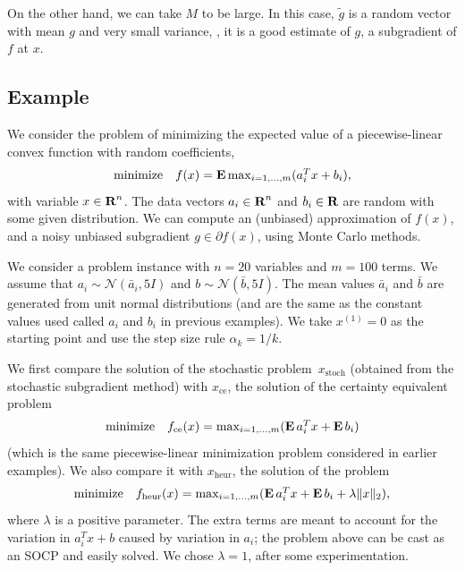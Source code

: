 \documentclass[12pt]{article}
\begin{document}
On the other hand, we can take $M$ to be large.  In this case,
$\tilde g$ is a random vector with mean $g$ and very small variance,
\ie, it is a good estimate of $g$, a subgradient of $f$ at $x$.

\subsection{Example}

We consider the problem of minimizing the expected value
of a piecewise-linear convex function with random coefficients,
\[
\begin{array}{ll} \mbox{minimize} &
f(x) = \mathop{\bf E{}} \max_{i=1,\ldots,m} (a_i^T x + b_i),
\end{array}
\]
with variable $x \in {\mbox{\bf R}}^n$.
The data vectors $a_i \in {\mbox{\bf R}}^n$ and $b_i \in {\mbox{\bf R}}$
are random with some given distribution.
We can compute an (unbiased) approximation of $f(x)$, and a
noisy unbiased subgradient $g \in \partial f(x)$, using
Monte Carlo methods.

We consider
a problem instance with $n=20$ variables and $m=100$ terms.
We assume that $a_i \sim \mathcal{N}(\bar a_i, 5 I)$
and $b \sim \mathcal{N}(\bar b, 5 I)$.
The mean values $\bar a_i$ and $\bar b$ are generated
from unit normal distributions (and are the same as the constant
values used called $a_i$ and $b_i$ in previous examples).
We take $x^{(1)}=0$ as the starting point
and use the step size rule $\alpha_k=1/k$.

We first compare the solution of the
stochastic problem~$x_\mathrm{stoch}$ (obtained from the
stochastic subgradient method) with $x_\mathrm{ce}$,
the solution of the certainty equivalent problem
\[
\begin{array}{ll} \mbox{minimize} &
f_\mathrm{ce} (x)
= \max_{i=1,\ldots,m} (\mathop{\bf E{}} a_i^T x +  \mathop{\bf E{}} b_i)
\end{array}
\]
(which is the same piecewise-linear minimization problem
considered in earlier examples).
We also compare it with $x_\mathrm{heur}$,
the solution of the problem
\[
\begin{array}{ll} \mbox{minimize} &
f_\mathrm{heur} (x)
= \max_{i=1,\ldots,m} (\mathop{\bf E{}} a_i^T x +  \mathop{\bf E{}} b_i +
\lambda \|x\|_2),
\end{array}
\]
where $\lambda$ is a positive parameter.
The extra terms are meant to account for the variation in $a_i^Tx+b$
caused by variation in $a_i$; the problem above can be cast as an SOCP
and easily solved.
We chose $\lambda = 1$, after some experimentation.
\end{document}
